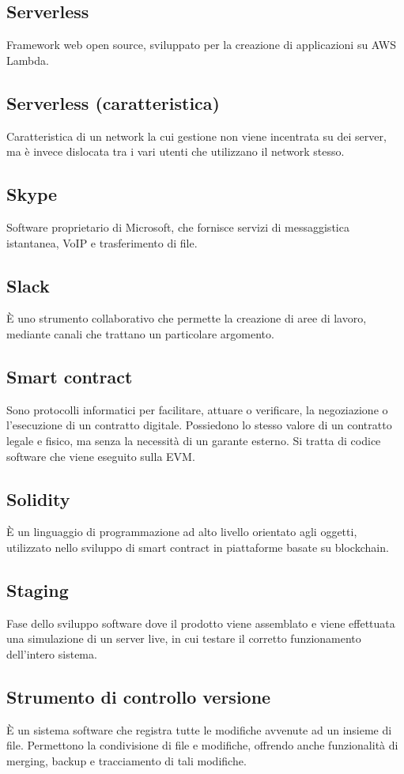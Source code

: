 	\subsection*{Serverless}
	Framework web open source, sviluppato per la creazione di applicazioni su AWS Lambda.
	\subsection*{Serverless (caratteristica)}
	Caratteristica di un network la cui gestione non viene incentrata su dei server, ma è invece dislocata tra i vari utenti che utilizzano il network stesso.
	\subsection*{Skype}
	Software proprietario di Microsoft, che fornisce servizi di messaggistica istantanea, VoIP e trasferimento di file.
	\subsection*{Slack}
	È uno strumento collaborativo che permette la creazione di aree di lavoro, mediante canali che trattano un particolare argomento.
	\subsection*{Smart contract}
	Sono protocolli informatici per facilitare, attuare o verificare, la negoziazione o l’esecuzione di un contratto digitale. Possiedono lo stesso valore di un contratto legale e fisico, ma senza la necessità di un garante esterno. Si tratta di codice software che viene eseguito sulla EVM.
	\subsection*{Solidity}
	È un linguaggio di programmazione ad alto livello orientato agli oggetti, utilizzato nello sviluppo di smart contract in piattaforme basate su blockchain.
	\subsection*{Staging}
	Fase dello sviluppo software dove il prodotto viene assemblato e viene effettuata una simulazione di un server live, in cui testare il corretto funzionamento dell'intero sistema.
	\subsection*{Strumento di controllo versione}
	È un sistema software che registra tutte le modifiche avvenute ad un insieme di file. Permettono la condivisione di file e modifiche, offrendo anche funzionalità di merging, backup e tracciamento di tali modifiche.
